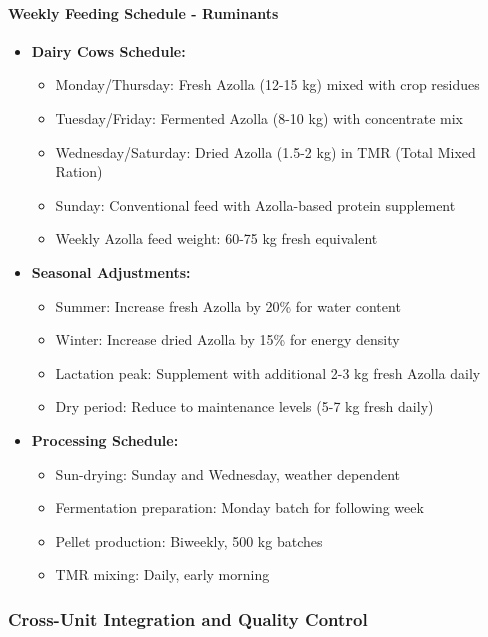 \paragraph{Weekly Feeding Schedule - Ruminants}
\begin{itemize}
    \item \textbf{Dairy Cows Schedule:}
    \begin{itemize}
        \item Monday/Thursday: Fresh Azolla (12-15 kg) mixed with crop residues
        \item Tuesday/Friday: Fermented Azolla (8-10 kg) with concentrate mix
        \item Wednesday/Saturday: Dried Azolla (1.5-2 kg) in TMR (Total Mixed Ration)
        \item Sunday: Conventional feed with Azolla-based protein supplement
        \item Weekly Azolla feed weight: 60-75 kg fresh equivalent
    \end{itemize}
    \item \textbf{Seasonal Adjustments:}
    \begin{itemize}
        \item Summer: Increase fresh Azolla by 20\% for water content
        \item Winter: Increase dried Azolla by 15\% for energy density
        \item Lactation peak: Supplement with additional 2-3 kg fresh Azolla daily
        \item Dry period: Reduce to maintenance levels (5-7 kg fresh daily)
    \end{itemize}
    \item \textbf{Processing Schedule:}
    \begin{itemize}
        \item Sun-drying: Sunday and Wednesday, weather dependent
        \item Fermentation preparation: Monday batch for following week
        \item Pellet production: Biweekly, 500 kg batches
        \item TMR mixing: Daily, early morning
    \end{itemize}
\end{itemize}

\subsubsection{Cross-Unit Integration and Quality Control}
\label{sec:feed_integration}

